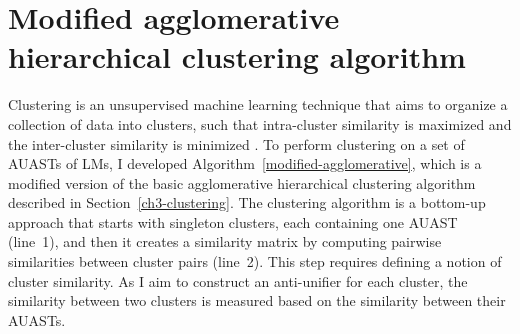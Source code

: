 \section{Modified agglomerative hierarchical clustering algorithm} \label{m-clustering-alg}
Clustering is an unsupervised machine learning technique that aims to organize a collection of data into clusters, such that intra-cluster similarity is maximized and the inter-cluster similarity is minimized \cite{karypis1999chameleon,grira2004unsupervised}.
To perform clustering on a set of AUASTs of LMs, I developed Algorithm~\ref{modified-agglomerative}, which is a modified version of the basic agglomerative hierarchical clustering algorithm described in Section~\ref{ch3-clustering}. The clustering algorithm is a bottom-up approach that starts with singleton clusters, each containing one AUAST (line~1), and then it creates a similarity matrix by computing pairwise similarities between cluster pairs (line~2). This step requires defining a notion of cluster similarity. As I aim to construct an anti-unifier for each cluster, the similarity between two clusters is measured based on the similarity between their AUASTs.



